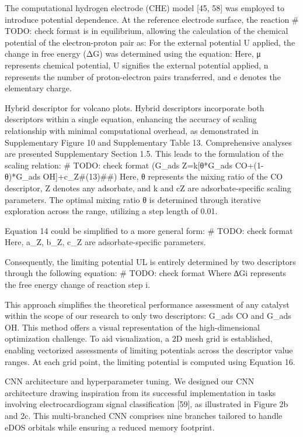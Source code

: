 The computational hydrogen electrode (CHE) model [45, 58] was employed to introduce potential dependence. At the reference electrode surface, the reaction
# TODO: check format
is in equilibrium, allowing the calculation of the chemical potential of the electron-proton pair as:
For the external potential U applied, the change in free energy (ΔG) was determined using the equation:
Here, μ represents chemical potential, U signifies the external potential applied, n represents the number of proton-electron pairs transferred, and e denotes the elementary charge.


Hybrid descriptor for volcano plots.
Hybrid descriptors incorporate both descriptors within a single equation, enhancing the accuracy of scaling relationship with minimal computational overhead, as demonstrated in Supplementary Figure 10 and Supplementary Table 13. Comprehensive analyses are presented Supplementary Section 1.5. This leads to the formulation of the scaling relation:
# TODO: check format
(G_ads Z=k[θ*G_ads CO+(1-θ)*G_ads OH]+c_Z#(13)##)
Here, θ represents the mixing ratio of the CO descriptor, Z denotes any adsorbate, and k and cZ are adsorbate-specific scaling parameters. The optimal mixing ratio θ is determined through iterative exploration across the range, utilizing a step length of 0.01.

Equation 14 could be simplified to a more general form:
# TODO: check format
Here, a_Z, b_Z, c_Z are adsorbate-specific parameters.

Consequently, the limiting potential UL is entirely determined by two descriptors through the following equation:
# TODO: check format
Where ∆Gi represents the free energy change of reaction step i.

This approach simplifies the theoretical performance assessment of any catalyst within the scope of our research to only two descriptors: G_ads CO and G_ads OH. This method offers a visual representation of the high-dimensional optimization challenge. To aid visualization, a 2D mesh grid is established, enabling vectorized assessments of limiting potentials across the descriptor value ranges. At each grid point, the limiting potential is computed using Equation 16.


CNN architecture and hyperparameter tuning.
We designed our CNN architecture drawing inspiration from its successful implementation in tasks involving electrocardiogram signal classification [59], as illustrated in Figure 2b and 2c. This multi-branched CNN comprises nine branches tailored to handle eDOS orbitals while ensuring a reduced memory footprint.

